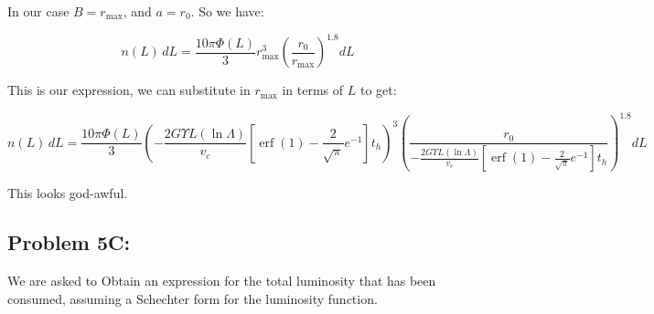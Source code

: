 In our case $B = r_{\mathrm{max}}$, and $a = r_0$. So we have:

\begin{equation}
     \boxed{n(L)\,dL = \frac{10\pi \Phi(L)}{3} r_{\mathrm{max}}^3(\frac{r_0}{r_{\mathrm{max}}})^{1.8}dL}
\end{equation}

This is our expression, we can substitute in $r_{\mathrm{max}}$ in terms of $L$ to get:

\begin{equation}
     \boxed{n(L)\,dL = \frac{10\pi \Phi(L)}{3} {(-\frac{2G\Upsilon L(\ln \Lambda)}{v_c}[\operatorname{erf}(1) - \frac{2}  {\sqrt{\pi}}e^{-1}] t_h)}^3(\frac{r_0}{-\frac{2G\Upsilon L(\ln \Lambda)}{v_c}[\operatorname{erf}(1) - \frac{2}  {\sqrt{\pi}}e^{-1}] t_h})^{1.8} dL}
\end{equation}

This looks god-awful. 

\subsection*{Problem 5C:}
We are asked to  Obtain an expression for the total luminosity that has been consumed, assuming a Schechter form for the luminosity
function.




